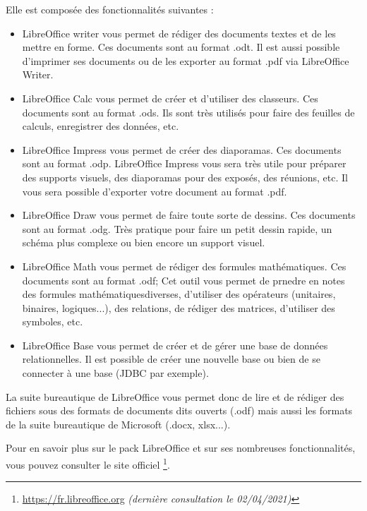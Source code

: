 \documentclass[12pt]{book}
\begin{document}
			Elle est composée des fonctionnalités suivantes :
		\begin{itemize}
			\item LibreOffice writer vous permet de rédiger des documents textes et de les mettre en forme.
			Ces documents sont au format .odt. 
			Il est aussi possible d'imprimer ses documents ou de les exporter au format .pdf via LibreOffice Writer.
			\item LibreOffice Calc vous permet de créer et d'utiliser des classeurs.
			Ces documents sont au format .ods. 
			Ils sont très utilisés pour faire des feuilles de calculs, enregistrer des données, etc.
			\item LibreOffice Impress vous permet de créer des diaporamas. 
			Ces documents sont au format .odp.
			LibreOffice Impress vous sera très utile pour préparer des supports visuels, des diaporamas pour des exposés, des réunions, etc.
			Il vous sera possible d'exporter votre document au format .pdf.
			\item LibreOffice Draw vous permet de faire toute sorte de dessins.
			Ces documents sont au format .odg.
			Très pratique pour faire un petit dessin rapide, un schéma plus complexe ou bien encore un support visuel.
			\item LibreOffice Math vous permet de rédiger des formules mathématiques.
			Ces documents sont au format .odf;
			Cet outil vous permet de prnedre en notes des formules mathématiquesdiverses, d'utiliser des opérateurs (unitaires, binaires, logiques...), des relations, de rédiger des matrices, d'utiliser des symboles, etc.
			\item LibreOffice Base vous permet de créer et de gérer une base de données relationnelles.
			Il est possible de créer une nouvelle base ou bien de se connecter à une base (JDBC par exemple). 
		\end{itemize}\par
		La suite bureautique de LibreOffice vous permet donc de lire et de rédiger des fichiers sous des formats de documents dits ouverts (.odf) mais aussi les formats de la suite bureautique de Microsoft (.docx, xlsx...).\par
		Pour en savoir plus sur le pack LibreOffice et sur ses nombreuses fonctionnalités, vous pouvez consulter le site officiel \footnote{
		\href{https://fr.libreoffice.org}{https://fr.libreoffice.org} \textit{(dernière consultation le 02/04/2021)}}.
\end{document}
